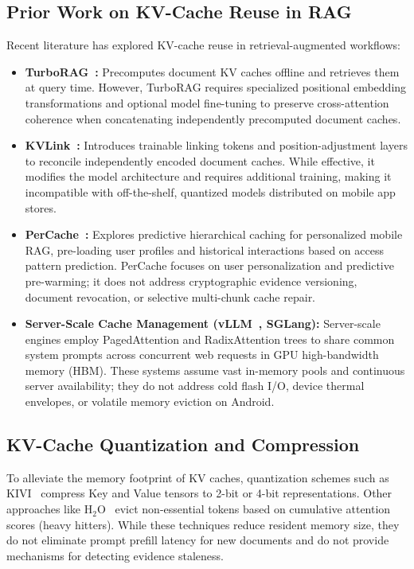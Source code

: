 \subsection{Prior Work on KV-Cache Reuse in RAG}
Recent literature has explored KV-cache reuse in retrieval-augmented workflows:
\begin{itemize}
    \item \textbf{TurboRAG~\cite{lu2024turborag}:} Precomputes document KV caches offline and retrieves them at query time. However, TurboRAG requires specialized positional embedding transformations and optional model fine-tuning to preserve cross-attention coherence when concatenating independently precomputed document caches.
    \item \textbf{KVLink~\cite{yang2025kvlink}:} Introduces trainable linking tokens and position-adjustment layers to reconcile independently encoded document caches. While effective, it modifies the model architecture and requires additional training, making it incompatible with off-the-shelf, quantized models distributed on mobile app stores.
    \item \textbf{PerCache~\cite{liu2026percache}:} Explores predictive hierarchical caching for personalized mobile RAG, pre-loading user profiles and historical interactions based on access pattern prediction. PerCache focuses on user personalization and predictive pre-warming; it does not address cryptographic evidence versioning, document revocation, or selective multi-chunk cache repair.
    \item \textbf{Server-Scale Cache Management (vLLM~\cite{kwon2023vllm}, SGLang):} Server-scale engines employ PagedAttention and RadixAttention trees to share common system prompts across concurrent web requests in GPU high-bandwidth memory (HBM). These systems assume vast in-memory pools and continuous server availability; they do not address cold flash I/O, device thermal envelopes, or volatile memory eviction on Android.
\end{itemize}

\subsection{KV-Cache Quantization and Compression}
To alleviate the memory footprint of KV caches, quantization schemes such as KIVI~\cite{liu2024kivi} compress Key and Value tensors to 2-bit or 4-bit representations. Other approaches like $\text{H}_2\text{O}$~\cite{zhang2024h2o} evict non-essential tokens based on cumulative attention scores (heavy hitters). While these techniques reduce resident memory size, they do not eliminate prompt prefill latency for new documents and do not provide mechanisms for detecting evidence staleness.

